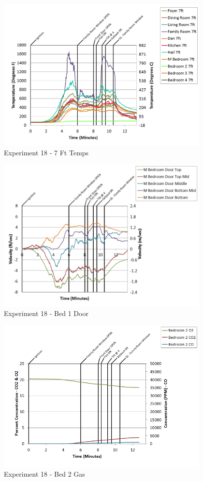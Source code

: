 \documentclass{article}
\begin{document}
\begin{appendices}
\begin{figure}[h!]
	\centering
	\includegraphics[height=3.05in]{0_Images/Results_Charts/Exp_18_Charts/7FtTemps.png}
	\caption{Experiment 18 - 7 Ft Temps}
\end{figure}

\clearpage

\begin{figure}[h!]
	\centering
	\includegraphics[height=3.05in]{0_Images/Results_Charts/Exp_18_Charts/Bed1Door.png}
	\caption{Experiment 18 - Bed 1 Door}
\end{figure}


\begin{figure}[h!]
	\centering
	\includegraphics[height=3.05in]{0_Images/Results_Charts/Exp_18_Charts/Bed2Gas.png}
	\caption{Experiment 18 - Bed 2 Gas}
\end{figure}


\end{appendices}
\end{document}
